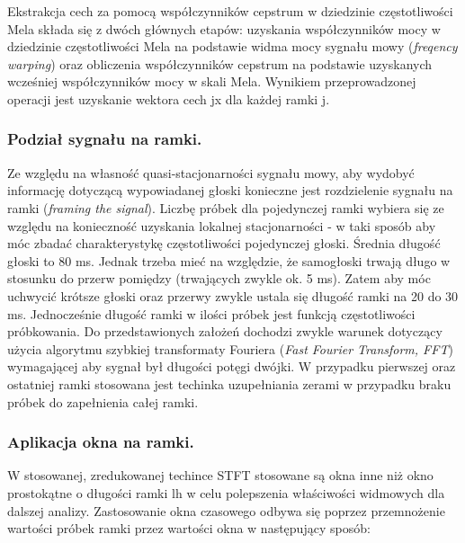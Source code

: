 Ekstrakcja cech za pomocą współczynników cepstrum w dziedzinie częstotliwości Mela składa się z dwóch głównych etapów: uzyskania współczynników mocy w dziedzinie częstotliwości Mela na podstawie widma mocy sygnału mowy (\textit{freqency warping}) oraz obliczenia współczynników cepstrum na podstawie uzyskanych wcześniej współczynników mocy w skali Mela. Wynikiem przeprowadzonej operacji jest uzyskanie wektora cech jx dla każdej ramki j.
%

\subsubsection{Podział sygnału na ramki.}
Ze względu na własność quasi-stacjonarności sygnału mowy, aby wydobyć informację dotyczącą wypowiadanej głoski konieczne jest rozdzielenie sygnału na ramki (\textit{framing the signal}).
Liczbę próbek dla pojedynczej ramki wybiera się ze względu na konieczność uzyskania lokalnej stacjonarności - w taki sposób aby móc zbadać charakterystykę częstotliwości pojedynczej głoski. Średnia długość głoski to 80 ms. Jednak trzeba mieć na względzie, że samogłoski trwają długo w stosunku do przerw pomiędzy (trwających zwykle ok. 5 ms). Zatem aby móc uchwycić krótsze głoski oraz przerwy zwykle ustala się długość ramki na 20 do 30 ms. Jednocześnie długość ramki w ilości próbek jest funkcją częstotliwości próbkowania. Do przedstawionych założeń dochodzi zwykle warunek dotyczący użycia algorytmu szybkiej transformaty Fouriera (\textit{Fast Fourier Transform, FFT}) wymagającej aby sygnał był długości potęgi dwójki. W przypadku pierwszej oraz ostatniej ramki stosowana jest techinka uzupełniania zerami w przypadku braku próbek do zapełnienia całej ramki.

\subsubsection{Aplikacja okna na ramki.}
W stosowanej, 
zredukowanej techince STFT stosowane są okna inne niż okno prostokątne o długości ramki lh w celu polepszenia właściwości widmowych dla dalszej analizy. Zastosowanie okna czasowego odbywa się poprzez przemnożenie wartości próbek ramki przez wartości okna w następujący sposób:

